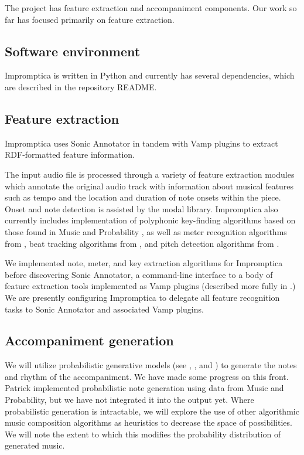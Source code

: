 \documentclass[11pt,conference,letterpaper]{IEEEtran}
\begin{document}
The project has feature extraction and accompaniment components. Our work so far has focused primarily on feature extraction.

\subsection{Software environment}

Impromptica is written in Python and currently has several dependencies, which are described in the repository README.

\subsection{Feature extraction}

Impromptica uses Sonic Annotator in tandem with Vamp plugins to extract RDF-formatted feature information.

The input audio file is processed through a variety of feature extraction modules which annotate the original audio track with information about musical features such as tempo and the location and duration of note onsets within the piece. Onset and note detection is assisted by the modal library. Impromptica also currently includes implementation of polyphonic key-finding algorithms based on those found in Music and Probability \cite{temperly2007mprob}, as well as meter recognition algorithms from \cite{klapuri2006analysis}, beat tracking algorithms from \cite{ellis2007beat}, and pitch detection algorithms from \cite{klapuri2003multiple}.

We implemented note, meter, and key extraction algorithms for Impromptica before discovering Sonic Annotator, a command-line interface to a body of feature extraction tools implemented as Vamp plugins (described more fully in \cite{cannam2010sonic}.) We are presently configuring Impromptica to delegate all feature recognition tasks to Sonic Annotator and associated Vamp plugins.

\subsection{Accompaniment generation}

We will utilize probabilistic generative models (see \cite{temperly2007mprob}, \cite{conklin2003music}, and \cite{mccormack1996grammar}) to generate the notes and rhythm of the accompaniment. We have made some progress on this front. Patrick implemented probabilistic note generation using data from Music and Probability, but we have not integrated it into the output yet. Where probabilistic generation is intractable, we will explore the use of other algorithmic music composition algorithms as heuristics to decrease the space of possibilities. We will note the extent to which this modifies the probability distribution of generated music.
\end{document}
